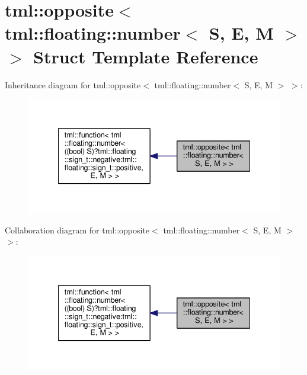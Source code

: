 \hypertarget{structtml_1_1opposite_3_01tml_1_1floating_1_1number_3_01_s_00_01_e_00_01_m_01_4_01_4}{\section{tml\+:\+:opposite$<$ tml\+:\+:floating\+:\+:number$<$ S, E, M $>$ $>$ Struct Template Reference}
\label{structtml_1_1opposite_3_01tml_1_1floating_1_1number_3_01_s_00_01_e_00_01_m_01_4_01_4}
}


Inheritance diagram for tml\+:\+:opposite$<$ tml\+:\+:floating\+:\+:number$<$ S, E, M $>$ $>$\+:
\nopagebreak
\begin{figure}[H]
\begin{center}
\leavevmode
\includegraphics[width=338pt]{structtml_1_1opposite_3_01tml_1_1floating_1_1number_3_01_s_00_01_e_00_01_m_01_4_01_4__inherit__graph}
\end{center}
\end{figure}


Collaboration diagram for tml\+:\+:opposite$<$ tml\+:\+:floating\+:\+:number$<$ S, E, M $>$ $>$\+:
\nopagebreak
\begin{figure}[H]
\begin{center}
\leavevmode
\includegraphics[width=338pt]{structtml_1_1opposite_3_01tml_1_1floating_1_1number_3_01_s_00_01_e_00_01_m_01_4_01_4__coll__graph}
\end{center}
\end{figure}
